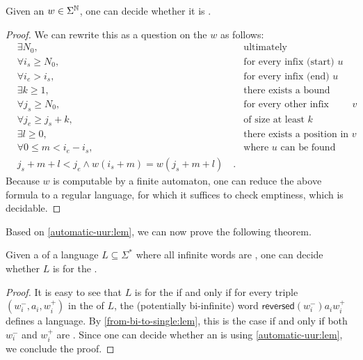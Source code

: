 \begin{lemma}
  \label{automatic-uur:lem}
    Given an  $w \in \Sigma^{\mathbb{N}}$, one can decide
    whether it is .
\end{lemma}
\begin{proof}
    We can rewrite this as a question on the  $w$
    as follows:
    \begin{align*}
        &\exists N_0,                   &   \text{ultimately} \\
        &\forall i_s \geq N_0,          &   \text{for every infix (start) } u \\
        &\forall i_e > i_s,             &   \text{for every infix (end) }   u \\
        &\exists k \geq 1,              &   \text{there exists a bound} \\
        &\forall j_s \geq N_0,          &   \text{for every other infix (start) } v \\
        &\forall j_e \geq j_s + k,      &   \text{of size at least $k$} \\
        &\exists l \geq 0,              &   \text{there exists a position in } v \\
        &\forall 0 \leq m < i_e - i_s,  &   \text{where } u \text{ can be found} \\
        &j_s + m + l < j_e \land
        w(i_s + m) = w(j_s + m + l) \quad .
    \end{align*}
    Because $w$ is computable by a finite automaton, one can reduce the above
    formula to a regular language, for which it suffices to check emptiness, which
    is decidable.
\end{proof}

Based on \cref{automatic-uur:lem}, we can now prove the following theorem.
\begin{theorem}
    \label{automatic-wqo:thm}
    Given a  of a language $L \subseteq
    \Sigma^*$ where all infinite words are , one can
    decide whether $L$ is  for the .
\end{theorem}
\begin{proof}
    It is easy to see that $L$ is  for the  if and only if for every triple $(w_i^-, a_i, w_i^+)$ in the
     of $L$, the (potentially bi-infinite) word
    $\mathsf{reversed}(w_i^-) a_i w_i^+$ defines a 
    language. By \cref{from-bi-to-single:lem}, this is the case if and only if
    both $w_i^-$ and $w_i^+$ are . 
    Since one can decide whether an  is
     using \cref{automatic-uur:lem},
    we conclude the proof.
\end{proof}


